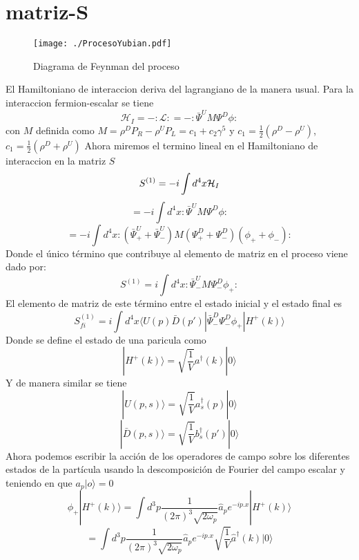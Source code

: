 \section{matriz-S}
\begin{figure}
\begin{center}
 \texttt{[image: ./ProcesoYubian.pdf]}
 \caption{Diagrama de Feynman del proceso}
\end{center}
\end{figure}
El Hamiltoniano de interaccion deriva del lagrangiano de la manera usual. Para la interaccion fermion-escalar se tiene
\begin{equation}
  \mathcal{H}_I=-:\mathcal{L}:
=-:\bar{\Psi}^{U}M\Psi^{D}\phi:
\end{equation}
con $M$ definida como $M= \rho^{D} P_R- \rho^{U} P_L=c_1+c_2\gamma^{5}$ y $c_1=\frac{1}{2}(\rho^{D} - \rho^{U})$, $c_1=\frac{1}{2}(\rho^{D} + \rho^{U})$
Ahora miremos el termino lineal en el  Hamiltoniano de interaccion en la matriz $S$
\[
 S^{(1)}=-i \int d^4x \mathcal{H}_I\\
\]
\[
 =-i \int d^4x :\bar{\Psi}^{U}M\Psi^{D}\phi:
\]
\[
 =-i \int d^4x :(\bar{\Psi}^{U}_{+}+\bar{\Psi}^{U}_{-})M(\Psi^{D}_{+}+\Psi^{D}_{-})(\phi_{+}+\phi_{-}):
\]
Donde el único término que contribuye al elemento de matriz en el proceso viene dado por:
\[
 S^{(1)}=i \int d^4x :\bar{\Psi}^{U}_{-}M\Psi^{D}_{-}\phi_{+}:
\]
El elemento de matriz de este término entre el estado inicial y el estado final es
\[
 S^{(1)}_{fi}=i \int d^4x \langle U(p)\bar{D}(p')|\bar{\Psi}^{D}_{-}\Psi^{D}_{-}\phi_{+}|H^{+}(k)\rangle
\]
Donde se define el estado de una paricula como
\begin{equation}
 |H^{+}(k)\rangle=\sqrt{\frac{1}{V}}a^{\dagger}(k)|0\rangle
\end{equation}
Y de manera similar se tiene
\begin{equation}
 |U(p,s)\rangle=\sqrt{\frac{1}{V}}a^{\dagger}_s(p)|0\rangle
\end{equation}
\begin{equation}
 |\bar{D}(p,s)\rangle=\sqrt{\frac{1}{V}}b^{\dagger}_s(p')|0\rangle
\end{equation}
Ahora podemos escribir la acción de los operadores de campo sobre los diferentes estados de la partícula
usando la descomposición de Fourier del campo escalar y teniendo en que $a_p|o\rangle=0$
\[
 \phi_{+}|H^{+}(k)\rangle=\int d^3p \frac{1}{(2\pi)^3\sqrt{2\omega_p}}\hat{a}_p e^{-ip.x}|H^{+}(k)\rangle
\]
\[
 =\int d^3p \frac{1}{(2\pi)^3\sqrt{2\omega_p}}\hat{a}_p e^{-ip.x}\sqrt{\frac{1}{V}}\hat{a}^{\dagger}(k)|0\rangle
\]
